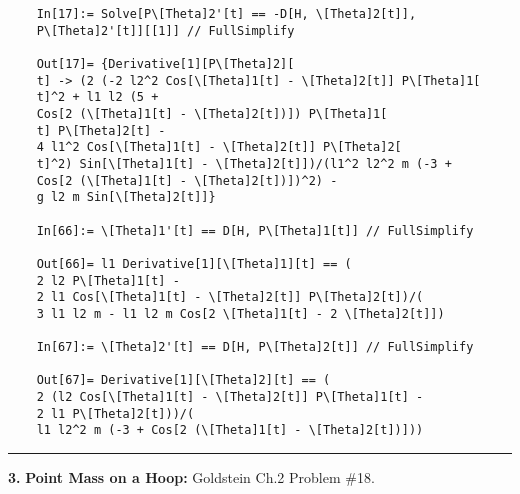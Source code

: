 \documentclass{article}
\theoremstyle{definition}
\begin{document}
\begin{enumerate}[label=(\alph*)]
\begin{lstlisting}
	In[17]:= Solve[P\[Theta]2'[t] == -D[H, \[Theta]2[t]], 
	P\[Theta]2'[t]][[1]] // FullSimplify
	
	Out[17]= {Derivative[1][P\[Theta]2][
	t] -> (2 (-2 l2^2 Cos[\[Theta]1[t] - \[Theta]2[t]] P\[Theta]1[
	t]^2 + l1 l2 (5 + 
	Cos[2 (\[Theta]1[t] - \[Theta]2[t])]) P\[Theta]1[
	t] P\[Theta]2[t] - 
	4 l1^2 Cos[\[Theta]1[t] - \[Theta]2[t]] P\[Theta]2[
	t]^2) Sin[\[Theta]1[t] - \[Theta]2[t]])/(l1^2 l2^2 m (-3 + 
	Cos[2 (\[Theta]1[t] - \[Theta]2[t])])^2) - 
	g l2 m Sin[\[Theta]2[t]]}
	
	In[66]:= \[Theta]1'[t] == D[H, P\[Theta]1[t]] // FullSimplify
	
	Out[66]= l1 Derivative[1][\[Theta]1][t] == (
	2 l2 P\[Theta]1[t] - 
	2 l1 Cos[\[Theta]1[t] - \[Theta]2[t]] P\[Theta]2[t])/(
	3 l1 l2 m - l1 l2 m Cos[2 \[Theta]1[t] - 2 \[Theta]2[t]])
	
	In[67]:= \[Theta]2'[t] == D[H, P\[Theta]2[t]] // FullSimplify
	
	Out[67]= Derivative[1][\[Theta]2][t] == (
	2 (l2 Cos[\[Theta]1[t] - \[Theta]2[t]] P\[Theta]1[t] - 
	2 l1 P\[Theta]2[t]))/(
	l1 l2^2 m (-3 + Cos[2 (\[Theta]1[t] - \[Theta]2[t])]))
	\end{lstlisting}
\end{enumerate}




\hrule

$\,$\\



\noindent \textbf{3.} \textbf{Point Mass on a Hoop:} Goldstein Ch.2 Problem \#18. 
\end{document}
